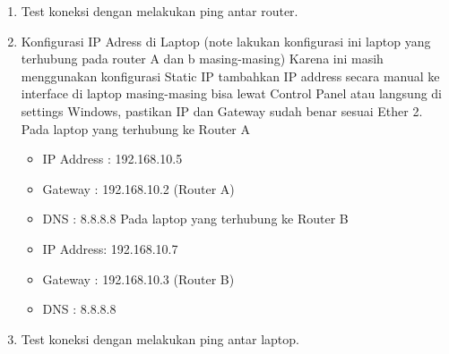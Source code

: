 \begin{enumerate}
\begin{enumerate}
        \item Test koneksi dengan melakukan ping antar router.
        \item Konfigurasi IP Adress di Laptop (note lakukan konfigurasi ini laptop yang terhubung pada router A dan b masing-masing) Karena ini masih menggunakan konfigurasi Static IP tambahkan IP address secara manual ke interface di laptop masing-masing bisa lewat Control Panel atau langsung di settings Windows, pastikan IP dan Gateway sudah benar sesuai Ether 2. Pada laptop yang terhubung ke Router A
        \begin{itemize}
            \item IP Address : 192.168.10.5
            \item Gateway : 192.168.10.2 (Router A)
            \item DNS : 8.8.8.8 \newline Pada laptop yang terhubung ke Router B
            \item IP Address: 192.168.10.7
            \item Gateway : 192.168.10.3 (Router B)
            \item DNS : 8.8.8.8
        \end{itemize}
        \item Test koneksi dengan melakukan ping antar laptop.
    \end{enumerate}
\end{enumerate}
